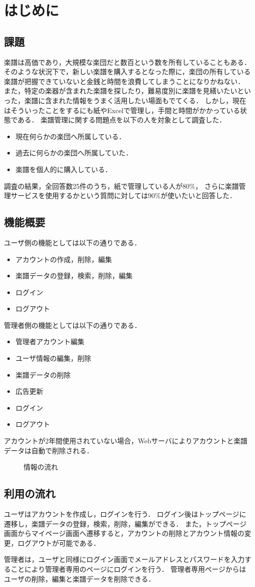 \chapter{{はじめに}}
\section{課題}
楽譜は高価であり，大規模な楽団だと数百という数を所有していることもある．
そのような状況下で，新しい楽譜を購入するとなった際に，楽団の所有している楽譜が把握できていないと金銭と時間を浪費してしまうことになりかねない．
また，特定の楽器が含まれた楽譜を探したり，難易度別に楽譜を見繕いたいといった，楽譜に含まれた情報をうまく活用したい場面もでてくる．
しかし，現在はそういったことをするにも紙やExcelで管理し，手間と時間がかかっている状態である．
楽譜管理に関する問題点を以下の人を対象として調査した．
\begin{itemize}
    \item 現在何らかの楽団へ所属している．
    \item 過去に何らかの楽団へ所属していた．
    \item 楽譜を個人的に購入している．
\end{itemize}
調査の結果，全回答数25件のうち，紙で管理している人が80\%，
さらに楽譜管理サービスを使用するかという質問に対しては90\%が使いたいと回答した．
\section{機能概要}
ユーザ側の機能としては以下の通りである．
\begin{itemize}
    \item アカウントの作成，削除，編集
    \item 楽譜データの登録，検索，削除，編集
    \item ログイン
    \item ログアウト
\end{itemize}
管理者側の機能としては以下の通りである．
\begin{itemize}
    \item 管理者アカウント編集
    \item ユーザ情報の編集，削除
    \item 楽譜データの削除
    \item 広告更新
    \item ログイン
    \item ログアウト
\end{itemize}
アカウントが2年間使用されていない場合，Webサーバによりアカウントと楽譜データは自動で削除される．
\begin{figure}[h]
    \centering
    
    \caption{情報の流れ}
\end{figure}
\section{利用の流れ}
ユーザはアカウントを作成し，ログインを行う．
ログイン後はトップページに遷移し，楽譜データの登録，検索，削除，編集ができる．
また，トップページ画面からマイページ画面へ遷移すると，アカウントの削除とアカウント情報の変更，ログアウトが可能である．\par
管理者は，ユーザと同様にログイン画面でメールアドレスとパスワードを入力することにより管理者専用のページにログインを行う．
管理者専用ページからはユーザの削除，編集と楽譜データを削除できる．